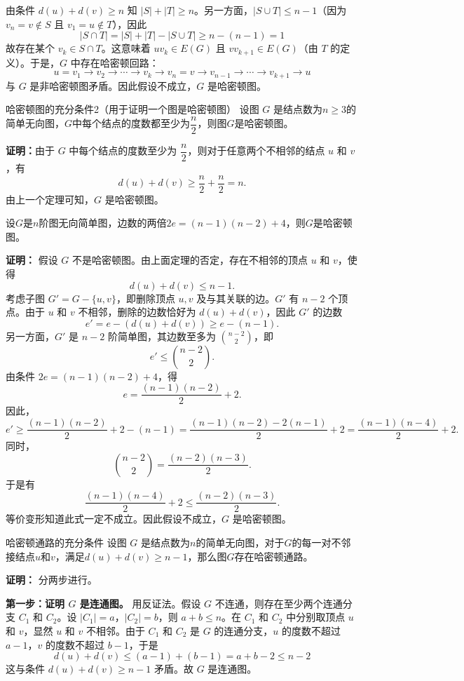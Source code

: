 \documentclass[lang=cn,11pt]{elegantbook}
\begin{document}
由条件 $d(u) + d(v) \ge n$ 知 $|S| + |T| \ge n$。另一方面，$|S \cup T| \le n-1$（因为 $v_n = v \notin S$ 且 $v_1 = u \notin T$），因此
\[
|S \cap T| = |S| + |T| - |S \cup T| \ge n - (n-1) = 1
\]
故存在某个 $v_k \in S \cap T$。这意味着 $uv_k \in E(G)$ 且 $v v_{k+1} \in E(G)$（由 $T$ 的定义）。于是，$G$ 中存在哈密顿回路：
\[
u = v_1 \to v_2 \to \cdots \to v_{k} \to v_n = v \to v_{n-1} \to \cdots \to v_{k+1} \to u
\]
与 $G$ 是非哈密顿图矛盾。因此假设不成立，$G$ 是哈密顿图。
\begin{theorem}{哈密顿图的充分条件2（用于证明一个图是哈密顿图）}
设图 $G$ 是结点数为$n\geqslant3$的简单无向图，$G$中每个结点的度数都至少为$\dfrac{n}2$，则图$G$是哈密顿图。
\end{theorem}
\textbf{证明：}由于 $G$ 中每个结点的度数至少为 $\dfrac{n}{2}$，则对于任意两个不相邻的结点 $u$ 和 $v$，有
    \[
    d(u) + d(v) \geqslant \frac{n}{2} + \frac{n}{2} = n.
    \]
由上一个定理可知，$G$ 是哈密顿图。
\begin{example}
    设$G$是$n$阶图无向简单图，边数的两倍$2e=(n-1)(n-2)+4$，则$G$是哈密顿图。
\end{example}
\textbf{证明：} 假设 $G$ 不是哈密顿图。由上面定理的否定，存在不相邻的顶点 $u$ 和 $v$，使得
    \[
    d(u) + d(v) \le n-1.
    \]
    考虑子图 $G' = G - \{u, v\}$，即删除顶点 $u, v$ 及与其关联的边。$G'$ 有 $n-2$ 个顶点。由于 $u$ 和 $v$ 不相邻，删除的边数恰好为 $d(u) + d(v)$，因此 $G'$ 的边数
    \[
    e' = e - (d(u) + d(v)) \ge e - (n-1).
    \]
    另一方面，$G'$ 是 $n-2$ 阶简单图，其边数至多为 $\binom{n-2}{2}$，即
    \[
    e' \le \binom{n-2}{2}.
    \]
    由条件 $2e = (n-1)(n-2) + 4$，得
    \[
    e = \frac{(n-1)(n-2)}{2} + 2.
    \]
    因此，
    \[
    e' \ge \frac{(n-1)(n-2)}{2} + 2 - (n-1) = \frac{(n-1)(n-2) - 2(n-1)}{2} + 2 = \frac{(n-1)(n-4)}{2} + 2.
    \]
    同时，
    \[
    \binom{n-2}{2} = \frac{(n-2)(n-3)}{2}.
    \]
    于是有
    \[
    \frac{(n-1)(n-4)}{2} + 2 \le \frac{(n-2)(n-3)}{2}.
    \]
    等价变形知道此式一定不成立。因此假设不成立，$G$ 是哈密顿图。
\begin{theorem}{哈密顿通路的充分条件}
    设图 $G$ 是结点数为$n$的简单无向图，对于$G$的每一对不邻接结点$u$和$v$，满足$d(u)+d(v)\geqslant n-1$，那么图$G$存在哈密顿通路。
\end{theorem}
\textbf{证明：}
    分两步进行。

    \textbf{第一步：证明 $G$ 是连通图。}
    用反证法。假设 $G$ 不连通，则存在至少两个连通分支 $C_1$ 和 $C_2$。设 $|C_1| = a$，$|C_2| = b$，则 $a + b \le n$。在 $C_1$ 和 $C_2$ 中分别取顶点 $u$ 和 $v$，显然 $u$ 和 $v$ 不相邻。由于 $C_1$ 和 $C_2$ 是 $G$ 的连通分支，$u$ 的度数不超过 $a-1$，$v$ 的度数不超过 $b-1$，于是
    \[
    d(u) + d(v) \le (a-1) + (b-1) = a + b - 2 \le n-2
    \]
    这与条件 $d(u) + d(v) \ge n-1$ 矛盾。故 $G$ 是连通图。
\end{document}
